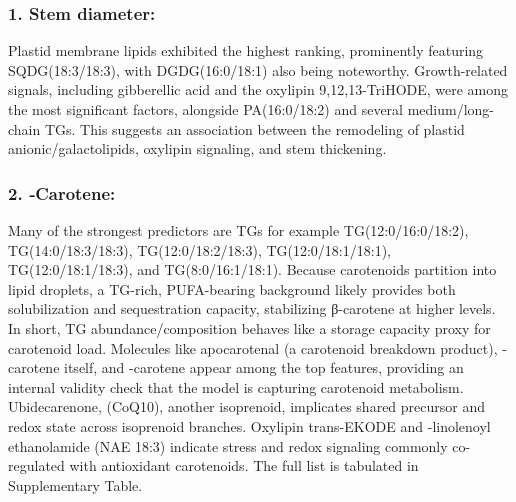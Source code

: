 \documentclass[10pt,letterpaper]{article}
\begin{document}




\subsubsection*{1. Stem diameter:} 
Plastid membrane lipids exhibited the highest ranking, prominently featuring SQDG(18:3/18:3), with DGDG(16:0/18:1) also being noteworthy. Growth-related signals, including gibberellic acid and the oxylipin 9,12,13-TriHODE, were among the most significant factors, alongside PA(16:0/18:2) and several medium/long-chain TGs. This suggests an association between the remodeling of plastid anionic/galactolipids, oxylipin signaling, and stem thickening.

\subsubsection*{2. \textbeta‐Carotene:}
Many of the strongest predictors are TGs for example TG(12:0/16:0/18:2), TG(14:0/18:3/18:3), TG(12:0/18:2/18:3), TG(12:0/18:1/18:1), TG(12:0/18:1/18:3), and TG(8:0/16:1/18:1). Because carotenoids partition into lipid droplets, a TG-rich, PUFA-bearing background likely provides both solubilization and sequestration capacity, stabilizing β-carotene at higher levels. In short, TG abundance/composition behaves like a storage capacity proxy for carotenoid load.
Molecules like apocarotenal (a carotenoid breakdown product), \textbeta-carotene itself, and \textalpha-carotene appear among the top features, providing an internal validity check that the model is capturing carotenoid metabolism. Ubidecarenone, (CoQ10), another isoprenoid, implicates shared precursor and redox state across isoprenoid branches. Oxylipin trans-EKODE and \textgamma-linolenoyl ethanolamide (NAE 18:3) indicate stress and redox signaling commonly co-regulated with antioxidant carotenoids. The full list is tabulated in Supplementary Table. 
\end{document}
